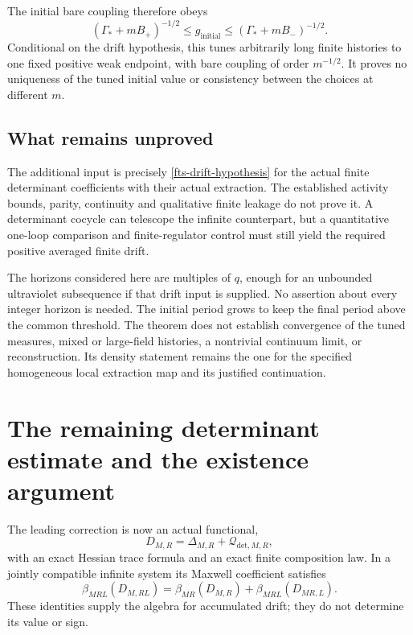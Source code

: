 \documentclass[11pt]{article}
\theoremstyle{remark}
\begin{document}
The initial bare coupling therefore obeys
\begin{equation}
 (\Gamma_*+mB_+)^{-1/2}
       \leq g_{\mathrm{initial}}
       \leq(\Gamma_*+mB_-)^{-1/2}.
 \label{fts-bare-coupling-bounds}
\end{equation}
Conditional on the drift hypothesis, this tunes arbitrarily
long finite histories to one fixed positive weak endpoint,
with bare coupling of order $m^{-1/2}$. It proves no
uniqueness of the tuned initial value or consistency between
the choices at different $m$.

\subsection{What remains unproved}
\label{fts-scope-section}

The additional input is precisely
\eqref{fts-drift-hypothesis} for the actual finite
determinant coefficients with their actual extraction.
The established activity bounds, parity, continuity and
qualitative finite leakage do not prove it. A determinant
cocycle can telescope the infinite counterpart, but a
quantitative one-loop comparison and finite-regulator
control must still yield the required positive averaged
finite drift.

The horizons considered here are multiples of $q$, enough
for an unbounded ultraviolet subsequence if that drift
input is supplied. No assertion about every integer
horizon is needed. The initial period grows to keep the
final period above the common threshold. The theorem
does not establish convergence of the tuned measures,
mixed or large-field histories, a nontrivial continuum
limit, or reconstruction. Its density statement remains
the one for the specified homogeneous local extraction
map and its justified continuation.


\section{The remaining determinant estimate and the existence argument}
\label{dfn-next}

The leading correction is now an actual functional,
\[
 D_{M,R}=\Delta_{M,R}+\mathcal Q_{\mathrm{det},M,R},
\]
with an exact Hessian trace formula and an exact finite
composition law. In a jointly compatible infinite system its
Maxwell coefficient satisfies
\[
 \beta_{MRL}(D_{M,RL})
   =\beta_{MR}(D_{M,R})+\beta_{MRL}(D_{MR,L}).
\]
These identities supply the algebra for accumulated drift;
they do not determine its value or sign.
\end{document}
